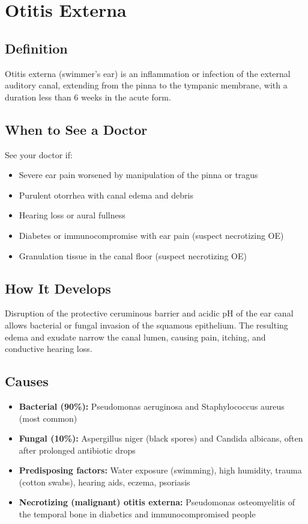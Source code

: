\chapter{Otitis Externa}

\section*{Definition}
Otitis externa (swimmer's ear) is an inflammation or infection of the external auditory canal, extending from the pinna to the tympanic membrane, with a duration less than 6 weeks in the acute form.

\section*{When to See a Doctor}
See your doctor if:
\begin{itemize}
  \item Severe ear pain worsened by manipulation of the pinna or tragus
  \item Purulent otorrhea with canal edema and debris
  \item Hearing loss or aural fullness
  \item Diabetes or immunocompromise with ear pain (suspect necrotizing OE)
  \item Granulation tissue in the canal floor (suspect necrotizing OE)
\end{itemize}

\section*{How It Develops}
Disruption of the protective ceruminous barrier and acidic pH of the ear canal allows bacterial or fungal invasion of the squamous epithelium. The resulting edema and exudate narrow the canal lumen, causing pain, itching, and conductive hearing loss.

\section*{Causes}
\begin{itemize}
  \item \textbf{Bacterial (90\%):} Pseudomonas aeruginosa and Staphylococcus aureus (most common)
  \item \textbf{Fungal (10\%):} Aspergillus niger (black spores) and Candida albicans, often after prolonged antibiotic drops
  \item \textbf{Predisposing factors:} Water exposure (swimming), high humidity, trauma (cotton swabs), hearing aids, eczema, psoriasis
  \item \textbf{Necrotizing (malignant) otitis externa:} Pseudomonas osteomyelitis of the temporal bone in diabetics and immunocompromised people
\end{itemize}

